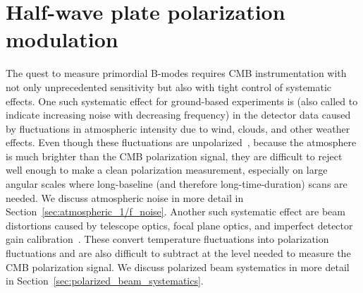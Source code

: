 \chapter{Half-wave plate polarization modulation}
\label{ch:hwp_polarization_modulation}

The quest to measure primordial B-modes requires CMB instrumentation with not only unprecedented sensitivity but also with tight control of systematic effects. One such systematic effect for ground-based experiments is  (also called  to indicate increasing noise with decreasing frequency) in the detector data caused by fluctuations in atmospheric intensity due to wind, clouds, and other weather effects. Even though these fluctuations are unpolarized~\cite{Hanany2003PolarizationExperiments,Spinelli2011AExperiments}, because the atmosphere is much brighter than the CMB polarization signal, they are difficult to reject well enough to make a clean polarization measurement, especially on large angular scales where long-baseline (and therefore long-time-duration) scans are needed. We discuss atmospheric noise in more detail in Section~\ref{sec:atmospheric_1/f_noise}. Another such systematic effect are beam distortions caused by telescope optics, focal plane optics, and imperfect detector gain calibration~\cite{shimon_cmb_2008}. These  convert temperature fluctuations into polarization fluctuations and are also difficult to subtract at the level needed to measure the CMB polarization signal. We discuss polarized beam systematics in more detail in Section~\ref{sec:polarized_beam_systematics}.

